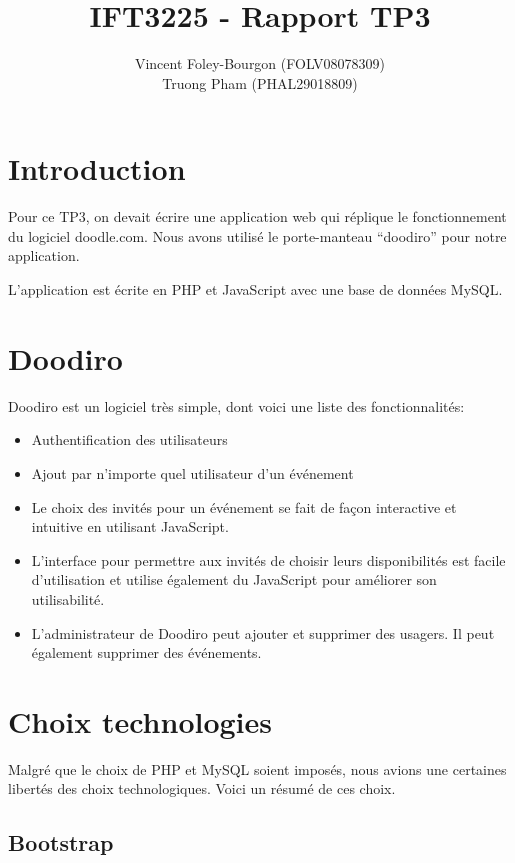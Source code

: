 \documentclass[10pt]{article}
\begin{document}
\title{IFT3225 - Rapport TP3}
\author{Vincent Foley-Bourgon (FOLV08078309) \\
Truong Pham (PHAL29018809)}
\maketitle

\section{Introduction}

Pour ce TP3, on devait écrire une application web qui réplique le
fonctionnement du logiciel doodle.com.  Nous avons utilisé le
porte-manteau ``doodiro'' pour notre application.

L'application est écrite en PHP et JavaScript avec une base de données
MySQL.

\section{Doodiro}

Doodiro est un logiciel très simple, dont voici une liste des
fonctionnalités:

\begin{itemize}
\item Authentification des utilisateurs
\item Ajout par n'importe quel utilisateur d'un événement
\item Le choix des invités pour un événement se fait de façon
  interactive et intuitive en utilisant JavaScript.
\item L'interface pour permettre aux invités de choisir leurs
  disponibilités est facile d'utilisation et utilise également du
  JavaScript pour améliorer son utilisabilité.
\item L'administrateur de Doodiro peut ajouter et supprimer des
  usagers.  Il peut également supprimer des événements.
\end{itemize}


\section{Choix technologies}

Malgré que le choix de PHP et MySQL soient imposés, nous avions une
certaines libertés des choix technologiques.  Voici un résumé de ces
choix.

\subsection{Bootstrap}
\end{document}
